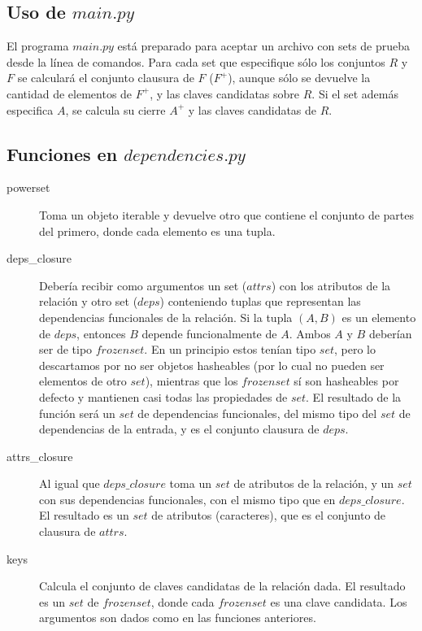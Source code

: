 \documentclass[a4paper]{report}
\begin{document}
\subsection*{Uso de $main.py$}
El programa $main.py$ est\'a preparado para aceptar un archivo con sets de
prueba desde la l\'inea de comandos. Para cada set que especifique s\'olo 
los conjuntos $R$ y $F$ se calcular\'a el conjunto clausura de $F$
($F^{+}$), aunque s\'olo se devuelve la cantidad de elementos de $F^{+}$,
y las claves candidatas sobre $R$. Si el set adem\'as especifica $A$,
se calcula su cierre $A^{+}$ y las claves candidatas de $R$.

\subsection*{Funciones en $dependencies.py$}
\begin{description}
\item [powerset] Toma un objeto iterable y devuelve otro que contiene
                el conjunto de partes del primero, donde cada elemento
                es una tupla.
\item [deps\_closure] Deber\'ia recibir como argumentos un set ($attrs$)
                con los atributos de la relaci\'on y otro set ($deps$)
                conteniendo tuplas que representan las dependencias
                funcionales de la relaci\'on. Si la tupla $(A,B)$ es
                un elemento de $deps$, entonces $B$ depende funcionalmente
                de $A$. Ambos $A$ y $B$ deber\'ian ser de tipo
                $frozenset$. En un principio estos ten\'ian tipo $set$,
                pero lo descartamos por no ser objetos hasheables (por lo
                cual no pueden ser elementos de otro $set$), mientras que
                los $frozenset$ s\'i son hasheables por defecto y
                mantienen casi todas las propiedades de $set$. El
                resultado de la funci\'on ser\'a un $set$ de dependencias
                funcionales, del mismo tipo del $set$ de dependencias de
                la entrada, y es el conjunto clausura de $deps$.
\item [attrs\_closure] Al igual que $deps\_closure$ toma un $set$ de
                atributos de la relaci\'on, y un $set$ con sus
                dependencias funcionales, con el mismo tipo que en
                $deps\_closure$. El resultado es un $set$ de atributos
                (caracteres), que es el conjunto de clausura de $attrs$.
\item [keys] Calcula el conjunto de claves candidatas de la relaci\'on
            dada. El resultado es un $set$ de $frozenset$, donde
            cada $frozenset$ es una clave candidata. Los argumentos
            son dados como en las funciones anteriores.
\end{description}
\end{document}
